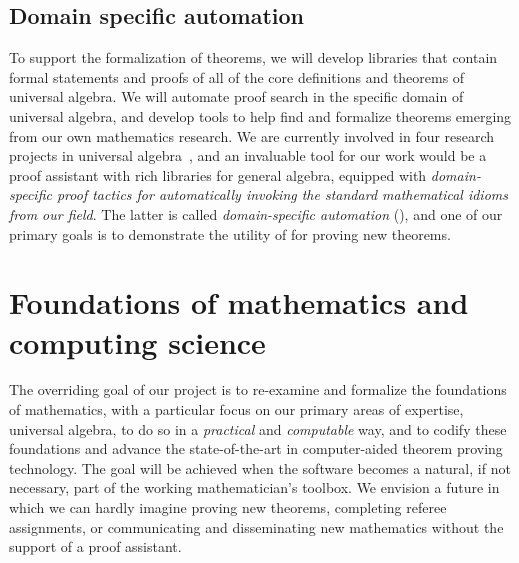 \documentclass[11pt]{amsart}  %
\begin{document}
\subsection{Domain specific automation}
To support the formalization of theorems, we will develop libraries that contain formal statements and proofs of all of the core definitions and theorems of universal algebra. We will automate proof search in the specific domain of universal algebra, and develop tools to help find and formalize theorems emerging from our own mathematics research. We are currently involved in four research projects in universal algebra~\cite{Bergman-DeMeo:2016,fin-lat-rep,DFV:2018,fg-free-lat}, and an invaluable tool for our work would be a proof assistant with rich libraries for general algebra, equipped with \emph{domain-specific proof tactics for automatically invoking the standard mathematical idioms from our field}. The latter is called \emph{domain-specific automation} (\dsa), and one of our primary goals is to demonstrate the utility of \dsa for proving new theorems.




\section{Foundations of mathematics and computing science}
The overriding goal of our project is to re-examine and formalize the foundations of mathematics, with a particular focus on our primary areas of expertise, universal algebra, to do so in a \emph{practical} and \emph{computable} way, and to codify these foundations and advance the state-of-the-art in computer-aided theorem proving technology. The goal will be achieved when the software becomes a natural, if not necessary, part of the working mathematician's toolbox.  We envision a future in which we can hardly imagine proving new theorems, completing referee assignments, or communicating and disseminating new mathematics without the support of a proof assistant.
\end{document}
